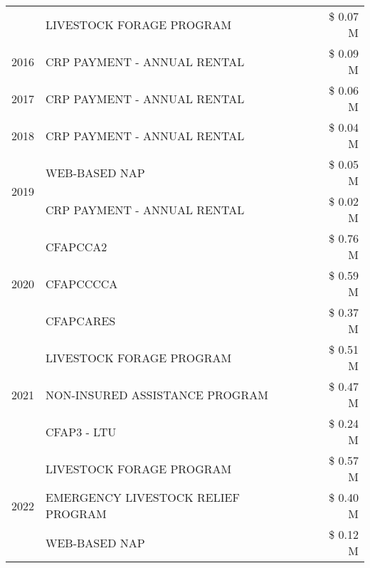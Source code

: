 \begin{tabular}{llr}
 & LIVESTOCK FORAGE PROGRAM & \$ 0.07 M \\
\cline{1-3}
2016 & CRP PAYMENT - ANNUAL RENTAL & \$ 0.09 M \\
\cline{1-3}
2017 & CRP PAYMENT - ANNUAL RENTAL & \$ 0.06 M \\
\cline{1-3}
2018 & CRP PAYMENT - ANNUAL RENTAL & \$ 0.04 M \\
\cline{1-3}
\multirow[t]{2}{*}{2019} & WEB-BASED NAP & \$ 0.05 M \\
 & CRP PAYMENT - ANNUAL RENTAL & \$ 0.02 M \\
\cline{1-3}
\multirow[t]{3}{*}{2020} & CFAPCCA2 & \$ 0.76 M \\
 & CFAPCCCCA & \$ 0.59 M \\
 & CFAPCARES & \$ 0.37 M \\
\cline{1-3}
\multirow[t]{3}{*}{2021} & LIVESTOCK FORAGE PROGRAM & \$ 0.51 M \\
 & NON-INSURED ASSISTANCE PROGRAM & \$ 0.47 M \\
 & CFAP3 - LTU & \$ 0.24 M \\
\cline{1-3}
\multirow[t]{3}{*}{2022} & LIVESTOCK FORAGE PROGRAM & \$ 0.57 M \\
 & EMERGENCY LIVESTOCK RELIEF PROGRAM & \$ 0.40 M \\
 & WEB-BASED NAP & \$ 0.12 M \\
\cline{1-3}
\bottomrule
\end{tabular}

